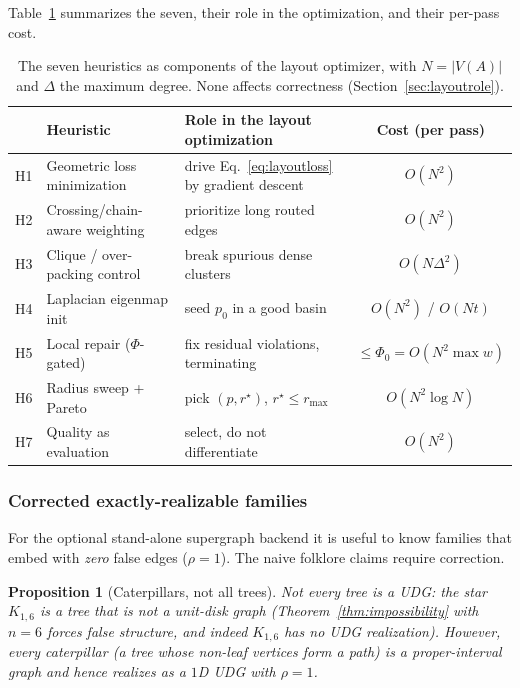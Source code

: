 \documentclass[11pt]{article}
\newtheorem{proposition}[theorem]{Proposition}
\theoremstyle{definition}
\theoremstyle{remark}
\begin{document}
Table~\ref{tab:heuristics} summarizes the seven, their role in the optimization, and
their per-pass cost.

\begin{table}[h]
\centering
\renewcommand{\arraystretch}{1.15}
\begin{tabular}{@{}cllc@{}}
\toprule
 & Heuristic & Role in the layout optimization & Cost (per pass) \\
\midrule
H1 & Geometric loss minimization    & drive Eq.~\eqref{eq:layoutloss} by gradient descent & $O(N^2)$ \\
H2 & Crossing/chain-aware weighting  & prioritize long routed edges & $O(N^2)$ \\
H3 & Clique / over-packing control   & break spurious dense clusters & $O(N\Delta^2)$ \\
H4 & Laplacian eigenmap init         & seed $p_0$ in a good basin & $O(N^2)$ / $O(Nt)$ \\
H5 & Local repair ($\Phi$-gated)     & fix residual violations, terminating & $\le\Phi_0=O(N^2\max w)$ \\
H6 & Radius sweep + Pareto           & pick $(p,r^\star)$, $r^\star\le r_{\max}$ & $O(N^2\log N)$ \\
H7 & Quality as evaluation           & select, do not differentiate & $O(N^2)$ \\
\bottomrule
\end{tabular}
\caption{The seven heuristics as components of the layout optimizer, with $N=|V(A)|$ and
$\Delta$ the maximum degree. None affects correctness
(Section~\ref{sec:layoutrole}).}
\label{tab:heuristics}
\end{table}

\subsubsection{Corrected exactly-realizable families}
\label{sec:families}

For the optional stand-alone supergraph backend it is useful to know families that embed
with \emph{zero} false edges ($\rho=1$). The naive folklore claims require correction.

\begin{proposition}[Caterpillars, not all trees]
\label{prop:caterpillar}
Not every tree is a UDG: the star $K_{1,6}$ is a tree that is not a unit-disk graph
(Theorem~\ref{thm:impossibility} with $n=6$ forces false structure, and indeed
$K_{1,6}$ has no UDG realization). However, every \emph{caterpillar} (a tree whose
non-leaf vertices form a path) is a proper-interval graph and hence realizes as a $1$D
UDG with $\rho=1$.
\end{proposition}
\end{document}
